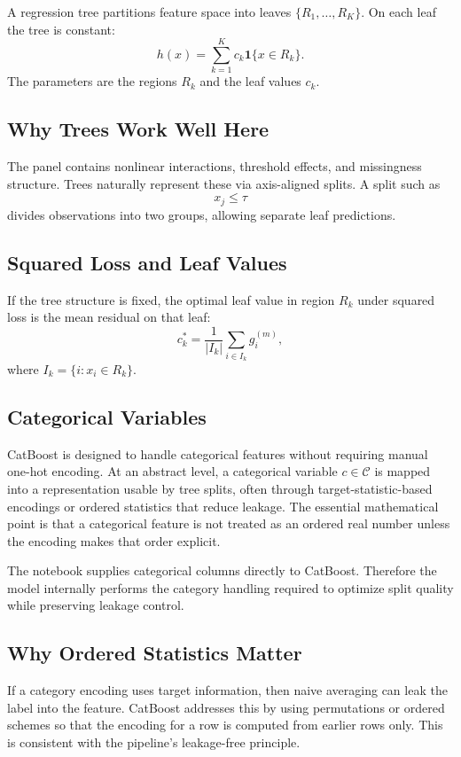 \documentclass[11pt]{article}
\newcommand{\1}{\mathbf{1}}
\begin{document}
A regression tree partitions feature space into leaves $\{R_1,\dots,R_K\}$. On each leaf the tree is constant:
\[
h(x) = \sum_{k=1}^K c_k \1\{x \in R_k\}.
\]
The parameters are the regions $R_k$ and the leaf values $c_k$.

\subsection{Why Trees Work Well Here}

The panel contains nonlinear interactions, threshold effects, and missingness structure. Trees naturally represent these via axis-aligned splits. A split such as
\[
x_j \le \tau
\]
divides observations into two groups, allowing separate leaf predictions.

\subsection{Squared Loss and Leaf Values}

If the tree structure is fixed, the optimal leaf value in region $R_k$ under squared loss is the mean residual on that leaf:
\[
c_k^* = \frac{1}{|I_k|} \sum_{i \in I_k} g_i^{(m)},
\]
where $I_k = \{i : x_i \in R_k\}$.

\subsection{Categorical Variables}

CatBoost is designed to handle categorical features without requiring manual one-hot encoding. At an abstract level, a categorical variable $c \in \mathcal{C}$ is mapped into a representation usable by tree splits, often through target-statistic-based encodings or ordered statistics that reduce leakage. The essential mathematical point is that a categorical feature is not treated as an ordered real number unless the encoding makes that order explicit.

The notebook supplies categorical columns directly to CatBoost. Therefore the model internally performs the category handling required to optimize split quality while preserving leakage control.

\subsection{Why Ordered Statistics Matter}

If a category encoding uses target information, then naive averaging can leak the label into the feature. CatBoost addresses this by using permutations or ordered schemes so that the encoding for a row is computed from earlier rows only. This is consistent with the pipeline's leakage-free principle.
\end{document}
